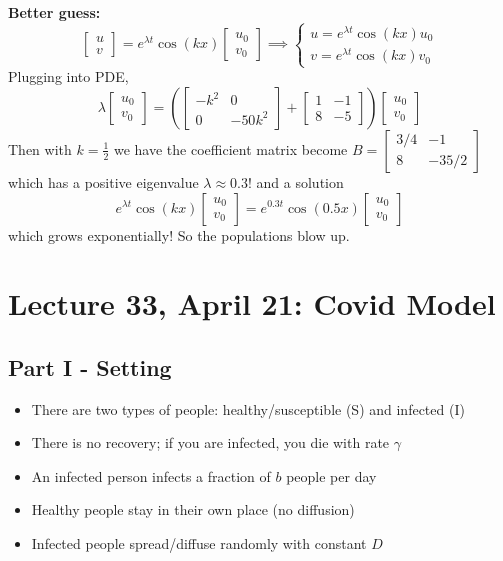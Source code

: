 \documentclass[12pt]{article}
\begin{document}
\textbf{Better guess:}
\[\begin{bmatrix}
    u\\v
\end{bmatrix} = e^{\lambda t}\cos(k x)\begin{bmatrix}
    u_0\\v_0
\end{bmatrix} \implies \begin{cases}
    u= e^{\lambda t}\cos(k x)u_0\\
    v = e^{\lambda t}\cos(k x)v_0
\end{cases}\]
Plugging into PDE, 
\[\lambda \begin{bmatrix}
    u_0\\
    v_0
\end{bmatrix} = \left(\begin{bmatrix}
    -k^2 & 0\\
    0 & -50k^2
\end{bmatrix} + \begin{bmatrix}
    1 & -1\\
    8 & -5
\end{bmatrix}\right)\begin{bmatrix}
    u_0\\
    v_0
\end{bmatrix}\]
Then with $k = \frac{1}{2}$ we have the coefficient matrix become $B = \begin{bmatrix}
    3/4 & -1\\
    8 & -35/2
\end{bmatrix}$ which has a positive eigenvalue $\lambda \approx 0.3$! and a solution 
\[e^{\lambda t} \cos(k x) \begin{bmatrix}
    u_0\\v_0
\end{bmatrix} = e^{0.3t}\cos(0.5x)\begin{bmatrix}
    u_0\\
    v_0
\end{bmatrix}\]
which grows exponentially! So the populations blow up. 

\section*{Lecture 33, April 21: Covid Model}
\subsection*{Part I - Setting}
\begin{itemize}
    \item There are two types of people: healthy/susceptible (S) and infected (I)
    \item There is no recovery; if you are infected, you die with rate $\gamma$
    \item An infected person infects a fraction of $b$ people per day
    \item Healthy people stay in their own place (no diffusion)
    \item Infected people spread/diffuse randomly with constant $D$
\end{itemize}
\end{document}
